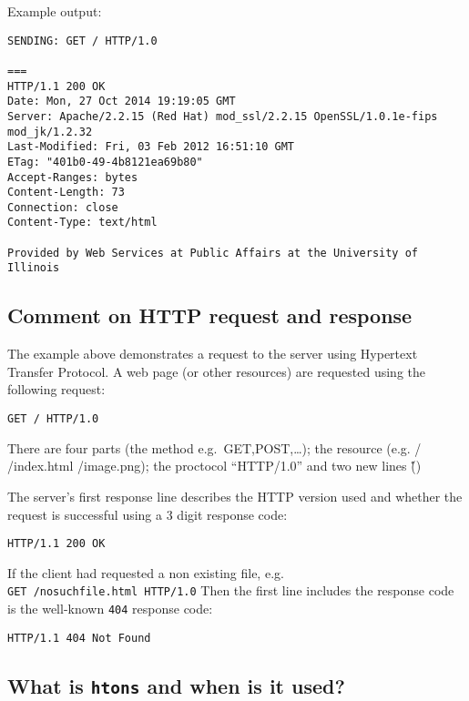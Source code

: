 Example output:

\begin{verbatim}
SENDING: GET / HTTP/1.0

===
HTTP/1.1 200 OK
Date: Mon, 27 Oct 2014 19:19:05 GMT
Server: Apache/2.2.15 (Red Hat) mod_ssl/2.2.15 OpenSSL/1.0.1e-fips mod_jk/1.2.32
Last-Modified: Fri, 03 Feb 2012 16:51:10 GMT
ETag: "401b0-49-4b8121ea69b80"
Accept-Ranges: bytes
Content-Length: 73
Connection: close
Content-Type: text/html

Provided by Web Services at Public Affairs at the University of Illinois
\end{verbatim}

\subsection{Comment on HTTP request and
response}\label{comment-on-http-request-and-response}

The example above demonstrates a request to the server using Hypertext
Transfer Protocol. A web page (or other resources) are requested using
the following request:

\begin{verbatim}
GET / HTTP/1.0
\end{verbatim}

There are four parts (the method e.g.~GET,POST,\ldots{}); the resource
(e.g. / /index.html /image.png); the proctocol ``HTTP/1.0'' and two new
lines (\r\n\r\n)

The server's first response line describes the HTTP version used and
whether the request is successful using a 3 digit response code:

\begin{verbatim}
HTTP/1.1 200 OK
\end{verbatim}

If the client had requested a non existing file, e.g.
\texttt{GET\ /nosuchfile.html\ HTTP/1.0} Then the first line includes
the response code is the well-known \texttt{404} response code:

\begin{verbatim}
HTTP/1.1 404 Not Found
\end{verbatim}

\subsection{\texorpdfstring{What is \texttt{htons} and when is it
used?}{What is htons and when is it used?}}\label{what-is-htons-and-when-is-it-used}

